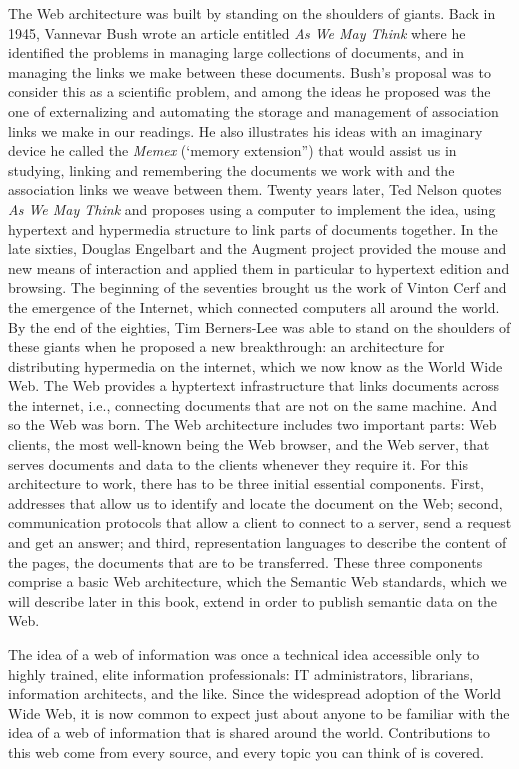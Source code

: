 The Web architecture was built by standing on the shoulders of giants. Back in 1945, Vannevar Bush wrote an article entitled \textit{As We May Think} where he identified the problems in managing large collections of documents, and in managing the links we make between these documents. Bush’s proposal was to consider this as a scientific problem, and among the ideas he proposed was the one of externalizing and automating the storage and management of association links we make in our readings. He also illustrates his ideas with an imaginary device he called the \textit{Memex} (‘memory extension”) that would assist us in studying, linking and remembering the documents we work with and the association links we weave between them. Twenty years later, Ted Nelson quotes \textit{As We May Think} and proposes using a computer to implement the idea, using hypertext and hypermedia structure to link parts of documents together. In the late sixties, Douglas Engelbart and the Augment project provided the mouse and new means of interaction and applied them in particular to hypertext edition and browsing. The beginning of the seventies brought us the work of Vinton Cerf and the emergence of the Internet, which connected computers all around the world. By the end of the eighties, Tim Berners-Lee was able to stand on the shoulders of these giants when he proposed a new breakthrough: an architecture for distributing hypermedia on the internet, which we now know as the World Wide Web. The Web provides a hyptertext infrastructure that links documents across the internet, i.e., connecting documents that are not on the same machine. And so the Web was born. The Web architecture includes two important parts: Web clients, the most well-known being the Web browser, and the Web server, that serves documents and data to the clients whenever they require it. For this architecture to work, there has to be three initial essential components. First, addresses that allow us to identify and locate the document on the Web; second, communication protocols that allow a client to connect to a server, send a request and get an answer; and third, representation languages to describe the content of the pages, the documents that are to be transferred. These three components comprise a basic Web architecture, which the Semantic Web standards, which we will describe later in this book, extend in order to publish semantic data on the Web.

The idea of a web of information was once a technical idea accessible only to highly trained, elite information professionals: IT administrators, librarians, information architects, and the like. Since the widespread adoption of the World Wide Web, it is now common to expect just about anyone to be familiar with the idea of a web of information that is shared around the world. Contributions to this web come from every source, and every topic you can think of is covered.

